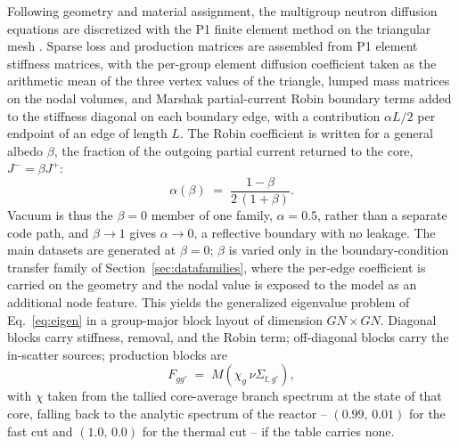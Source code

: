 \documentclass[preprint,12pt]{elsarticle}
\begin{document}
Following geometry and material assignment, the multigroup neutron diffusion
equations are discretized with the P1 finite element method on the triangular
mesh \citep{duderstadt1976,stacey2007}. Sparse loss and production matrices are assembled from P1 element
stiffness matrices, with the per-group element diffusion coefficient taken as
the arithmetic mean of the three vertex values of the triangle, lumped mass
matrices on the nodal volumes, and Marshak partial-current Robin boundary terms
\citep{marshak1947} added to the stiffness diagonal on each boundary edge, with a
contribution $\alpha L/2$ per endpoint of an edge of length $L$. The Robin
coefficient is written for a general albedo $\beta$, the fraction of the outgoing
partial current returned to the core, $J^- = \beta J^+$:
\begin{equation}
\alpha(\beta) \;=\; \frac{1-\beta}{2\,(1+\beta)} .
\label{eq:albedo}
\end{equation}
Vacuum is thus the $\beta=0$ member of one family, $\alpha = 0.5$, rather than a
separate code path, and $\beta\rightarrow1$ gives $\alpha\rightarrow0$, a
reflective boundary with no leakage. The main datasets are generated at
$\beta=0$; $\beta$ is varied only in the boundary-condition transfer family of
Section~\ref{sec:datafamilies}, where the per-edge coefficient is carried on the
geometry and the nodal value is exposed to the model as an additional node
feature. This yields the
generalized eigenvalue problem of Eq.~\eqref{eq:eigen} in a group-major block
layout of dimension $GN \times GN$. Diagonal blocks carry stiffness, removal, and
the Robin term; off-diagonal blocks carry the in-scatter sources; production
blocks are
\begin{equation}
F_{gg'} \;=\; M\!\left(\chi_g\, \nu\Sigma_{\mathrm{f},g'}\right),
\label{eq:prodblock}
\end{equation}
with $\chi$ taken from the tallied core-average branch spectrum at the state of
that core, falling back to the analytic spectrum of the reactor -- $(0.99,\,0.01)$
for the fast cut and $(1.0,\,0.0)$ for the thermal cut -- if the table carries
none.
\end{document}
